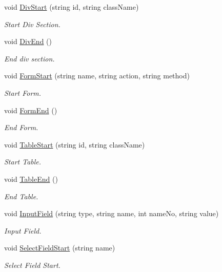 \begin{DoxyCompactItemize}
void \hyperlink{classHTMLTags_a897512b202cfd12729e8fa24e67ea4d6}{Div\-Start} (string id, string class\-Name)
\begin{DoxyCompactList}\small\item\em Start Div Section. \end{DoxyCompactList}\item 
void \hyperlink{classHTMLTags_aa82b2d3d85b3afd29e5641dbe1ace439}{Div\-End} ()
\begin{DoxyCompactList}\small\item\em End div section. \end{DoxyCompactList}\item 
void \hyperlink{classHTMLTags_a1489ccf4629069eca5e550eeb8e8e887}{Form\-Start} (string name, string action, string method)
\begin{DoxyCompactList}\small\item\em Start Form. \end{DoxyCompactList}\item 
void \hyperlink{classHTMLTags_ab57baef28db9590ce59d0e2f403a210f}{Form\-End} ()
\begin{DoxyCompactList}\small\item\em End Form. \end{DoxyCompactList}\item 
void \hyperlink{classHTMLTags_a9d4bc37c7d615bc1d7f7c738dae48ad3}{Table\-Start} (string id, string class\-Name)
\begin{DoxyCompactList}\small\item\em Start Table. \end{DoxyCompactList}\item 
void \hyperlink{classHTMLTags_a0655d9f70a8c1a61c406280d8fb9df7a}{Table\-End} ()
\begin{DoxyCompactList}\small\item\em End Table. \end{DoxyCompactList}\item 
void \hyperlink{classHTMLTags_a705aef36f0847c2a5f10a5df8e079ce8}{Input\-Field} (string type, string name, int name\-No, string value)
\begin{DoxyCompactList}\small\item\em Input Field. \end{DoxyCompactList}\item 
void \hyperlink{classHTMLTags_adb6e7ef0a1320dbf6d4acbe1ea3e418f}{Select\-Field\-Start} (string name)
\begin{DoxyCompactList}\small\item\em Select Field Start. \end{DoxyCompactList}\item 

\end{DoxyCompactItemize}
